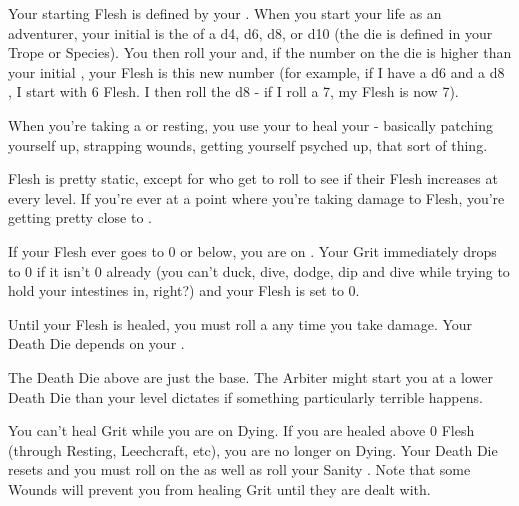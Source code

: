 {Your starting Flesh is defined by your \FLESH.  When you start your life as an adventurer, your initial \FLESH is the \MAX of a d4, d6, d8, or d10 (the die is defined in your Trope or Species). You then roll your \VIG and, if the number on the die is higher than your initial \FLESH, your \MAX Flesh is this new number (for example, if I have a d6 \FLESH and a d8 \VIG, I start with 6 Flesh.  I then roll the d8 - if I roll a 7, my \MAX Flesh is now 7).

When you're taking a  or resting, you use your \FLESH to heal your  - basically patching yourself up, strapping wounds, getting yourself psyched up, that sort of thing.  

Flesh is pretty static, except for  who get to roll to see if their Flesh increases at every level.  If you're ever at a point where you're taking damage to Flesh, you're getting pretty close to .



  If your Flesh ever goes to 0 or below, you are on  .  Your Grit immediately drops to 0 if it isn't 0 already (you can't duck, dive, dodge, dip and dive while trying to hold your intestines in, right?) and your Flesh is set to 0.

  Until your Flesh is healed, you must roll a \DEATH any time you take damage.  Your Death Die depends on your \LVL.


  The Death Die above are just the base. The Arbiter might start you at a lower Death Die than your level dictates if something particularly terrible happens. 

  You can't heal Grit while you are on Dying.  If you are healed above 0 Flesh (through Resting, Leechcraft, etc), you are no longer on Dying.  Your Death Die resets and you must roll on the  as well as roll your Sanity \UD.  Note that some Wounds will prevent you from healing Grit until they are dealt with.


}
